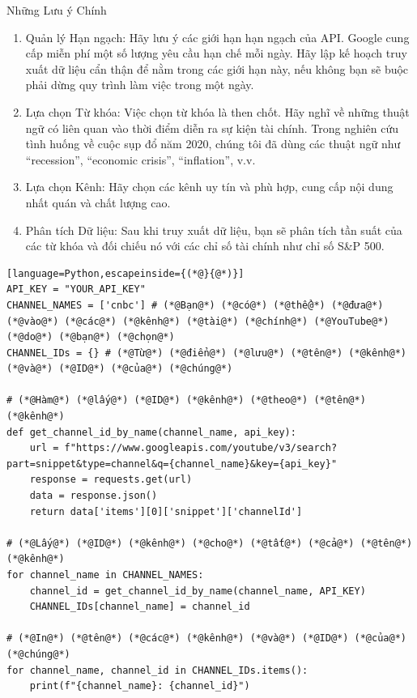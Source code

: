 Những Lưu ý Chính

\begin{enumerate}
  \item Quản lý Hạn ngạch: Hãy lưu ý các giới hạn hạn ngạch của API. Google cung cấp miễn phí một số lượng yêu cầu hạn chế mỗi ngày. Hãy lập kế hoạch truy xuất dữ liệu cẩn thận để nằm trong các giới hạn này, nếu không bạn sẽ buộc phải dừng quy trình làm việc trong một ngày.

  \item Lựa chọn Từ khóa: Việc chọn từ khóa là then chốt. Hãy nghĩ về những thuật ngữ có liên quan vào thời điểm diễn ra sự kiện tài chính. Trong nghiên cứu tình huống về cuộc sụp đổ năm 2020, chúng tôi đã dùng các thuật ngữ như ``recession'', ``economic crisis'', ``inflation'', v.v.

  \item Lựa chọn Kênh: Hãy chọn các kênh uy tín và phù hợp, cung cấp nội dung nhất quán và chất lượng cao.

  \item Phân tích Dữ liệu: Sau khi truy xuất dữ liệu, bạn sẽ phân tích tần suất của các từ khóa và đối chiếu nó với các chỉ số tài chính như chỉ số S\&P 500.
\end{enumerate}

\begin{lstlisting}[language=Python,escapeinside={(*@}{@*)}]
API_KEY = "YOUR_API_KEY"
CHANNEL_NAMES = ['cnbc'] # (*@Bạn@*) (*@có@*) (*@thể@*) (*@đưa@*) (*@vào@*) (*@các@*) (*@kênh@*) (*@tài@*) (*@chính@*) (*@YouTube@*) (*@do@*) (*@bạn@*) (*@chọn@*)
CHANNEL_IDs = {} # (*@Từ@*) (*@điển@*) (*@lưu@*) (*@tên@*) (*@kênh@*) (*@và@*) (*@ID@*) (*@của@*) (*@chúng@*)

# (*@Hàm@*) (*@lấy@*) (*@ID@*) (*@kênh@*) (*@theo@*) (*@tên@*) (*@kênh@*)
def get_channel_id_by_name(channel_name, api_key):
    url = f"https://www.googleapis.com/youtube/v3/search?part=snippet&type=channel&q={channel_name}&key={api_key}"
    response = requests.get(url)
    data = response.json()
    return data['items'][0]['snippet']['channelId']

# (*@Lấy@*) (*@ID@*) (*@kênh@*) (*@cho@*) (*@tất@*) (*@cả@*) (*@tên@*) (*@kênh@*)
for channel_name in CHANNEL_NAMES:
    channel_id = get_channel_id_by_name(channel_name, API_KEY)
    CHANNEL_IDs[channel_name] = channel_id

# (*@In@*) (*@tên@*) (*@các@*) (*@kênh@*) (*@và@*) (*@ID@*) (*@của@*) (*@chúng@*)
for channel_name, channel_id in CHANNEL_IDs.items():
    print(f"{channel_name}: {channel_id}")
\end{lstlisting}

